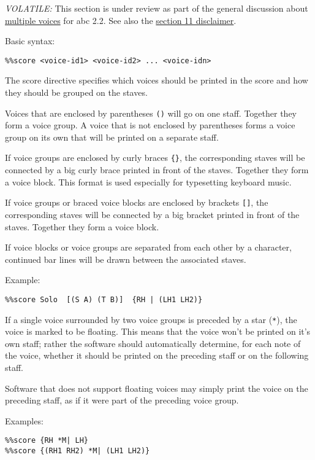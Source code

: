 \emph{VOLATILE:} This section is under review as part of the general
discussion about \protect\hyperlink{multiple_voices}{multiple voices}
for abc 2.2. See also the \protect\hyperlink{disclaimer}{section 11
disclaimer}.

Basic syntax:

\begin{verbatim}
%%score <voice-id1> <voice-id2> ... <voice-idn>
\end{verbatim}

The score directive specifies which voices should be printed in the
score and how they should be grouped on the staves.

Voices that are enclosed by parentheses \texttt{()} will go on one
staff. Together they form a voice group. A voice that is not enclosed by
parentheses forms a voice group on its own that will be printed on a
separate staff.

If voice groups are enclosed by curly braces \texttt{\{\}}, the
corresponding staves will be connected by a big curly brace printed in
front of the staves. Together they form a voice block. This format is
used especially for typesetting keyboard music.

If voice groups or braced voice blocks are enclosed by brackets
\texttt{{[}{]}}, the corresponding staves will be connected by a big
bracket printed in front of the staves. Together they form a voice
block.

If voice blocks or voice groups are separated from each other by a
\texttt{\textbar{}} character, continued bar lines will be drawn between
the associated staves.

Example:

\begin{verbatim}
%%score Solo  [(S A) (T B)]  {RH | (LH1 LH2)}
\end{verbatim}

If a single voice surrounded by two voice groups is preceded by a star
(\texttt{*}), the voice is marked to be floating. This means that the
voice won't be printed on it's own staff; rather the software should
automatically determine, for each note of the voice, whether it should
be printed on the preceding staff or on the following staff.

Software that does not support floating voices may simply print the
voice on the preceding staff, as if it were part of the preceding voice
group.

Examples:

\begin{verbatim}
%%score {RH *M| LH}
%%score {(RH1 RH2) *M| (LH1 LH2)}
\end{verbatim}

